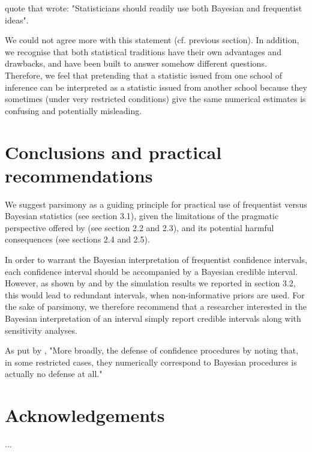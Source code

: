 \documentclass[a4paper,man,natbib,floatsintext,donotrepeattitle]{apa6}
\begin{document}
\cite{albers_credible_2018} quote \cite{bayarri_interplay_2004} that wrote: "Statisticians should readily use both Bayesian and frequentist ideas".

We could not agree more with this statement (cf. previous section). In addition, we recognise that both statistical traditions have their own advantages and drawbacks, and have been built to answer somehow different questions. Therefore, we feel that pretending that a statistic issued from one school of inference can be interpreted as a statistic issued from another school because they sometimes (under very restricted conditions) give the same numerical estimates is confusing and potentially misleading.

\section{Conclusions and practical recommendations}

We suggest parsimony as a guiding principle for practical use of frequentist versus Bayesian statistics (see section 3.1), given the limitations of the pragmatic perspective offered by \cite{albers_credible_2018} (see section 2.2 and 2.3), and its potential harmful consequences (see sections 2.4 and 2.5).

In order to warrant the Bayesian interpretation of frequentist confidence intervals, each confidence interval should be accompanied by a Bayesian credible interval. However, as shown by \cite{albers_credible_2018} and by the simulation results we reported in section 3.2, this would lead to redundant intervals, when non-informative priors are used. For the sake of parsimony, we therefore recommend that a researcher interested in the Bayesian interpretation of an interval simply report credible intervals along with sensitivity analyses.

As put by \cite{morey_fallacy_2015}, "More broadly, the defense of confidence procedures by noting that, in some restricted cases, they numerically correspond to Bayesian procedures is actually no defense at all."

\section{Acknowledgements}

...


\end{document}
